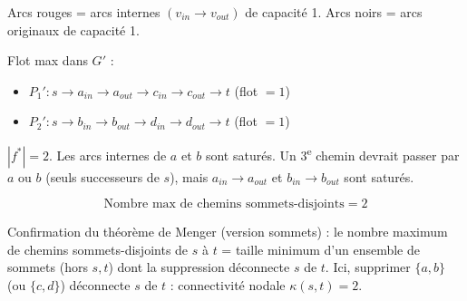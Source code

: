 \documentclass[12pt,a4paper]{article}
\begin{document}
\begin{correction}
\begin{center}
\end{center}

{\small Arcs rouges = arcs internes $(v_{in} \to v_{out})$ de capacit\'e 1. Arcs noirs = arcs originaux de capacit\'e 1.}

\medskip
Flot max dans $G'$ :
\begin{itemize}[nosep]
    \item $P_1' : s \to a_{in} \to a_{out} \to c_{in} \to c_{out} \to t$ (flot $= 1$)
    \item $P_2' : s \to b_{in} \to b_{out} \to d_{in} \to d_{out} \to t$ (flot $= 1$)
\end{itemize}

$|f^*| = 2$. Les arcs internes de $a$ et $b$ sont satur\'es. Un 3\textsuperscript{e} chemin devrait passer par $a$ ou $b$ (seuls successeurs de $s$), mais $a_{in} \to a_{out}$ et $b_{in} \to b_{out}$ sont satur\'es.

$$\boxed{\text{Nombre max de chemins sommets-disjoints} = 2}$$

Confirmation du th\'eor\`eme de Menger (version sommets) : le nombre maximum de chemins sommets-disjoints de $s$ \`a $t$ = taille minimum d'un ensemble de sommets (hors $s,t$) dont la suppression d\'econnecte $s$ de $t$. Ici, supprimer $\{a, b\}$ (ou $\{c, d\}$) d\'econnecte $s$ de $t$ : connectivit\'e nodale $\kappa(s,t) = 2$.
\end{correction}
\end{document}
